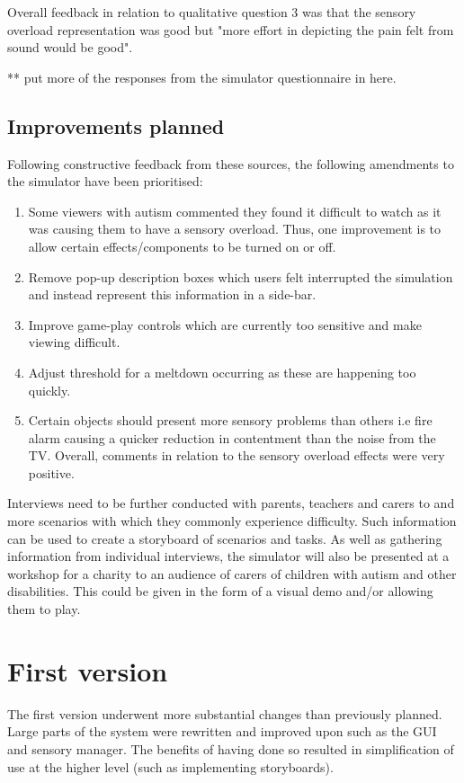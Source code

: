 \documentclass[11pt]{report}
\begin{document}
Overall feedback in relation to qualitative question 3 was that the sensory overload representation was good but "more effort in depicting the pain felt from sound would be good". 

** put more of the responses from the simulator questionnaire in here.

\section{Improvements planned}
Following constructive feedback from these sources, the following amendments to the simulator have been prioritised:

\begin{enumerate}
\item Some viewers with autism commented they found it difficult to watch as it was causing them to have a sensory overload. Thus, one improvement is to allow certain effects/components to be turned on or off.
\item Remove pop-up description boxes which users felt interrupted the simulation and instead represent this information in a side-bar.
\item Improve game-play controls which are currently too sensitive and make viewing difficult.
\item Adjust threshold for a meltdown occurring as these are happening too
quickly.
\item Certain objects should present more sensory problems than others i.e fire alarm causing a quicker reduction in contentment than the noise from the TV. Overall, comments in relation to the sensory overload effects were very positive.
\end{enumerate}

Interviews need to be further conducted with parents, teachers and carers to and more scenarios with which they commonly experience difficulty. Such information can be used to create a storyboard of scenarios and tasks. As
well as gathering information from individual interviews, the simulator will also be presented at a workshop for a charity to an audience of carers of children with autism and other disabilities. This could be given in the form of a visual demo and/or allowing them to play.

\chapter{First version}
The first version underwent more substantial changes than previously planned. Large parts of the system were rewritten and improved upon such as the GUI and sensory manager. The benefits of having  done so resulted in simplification of use at the higher level (such as implementing storyboards).
\end{document}
